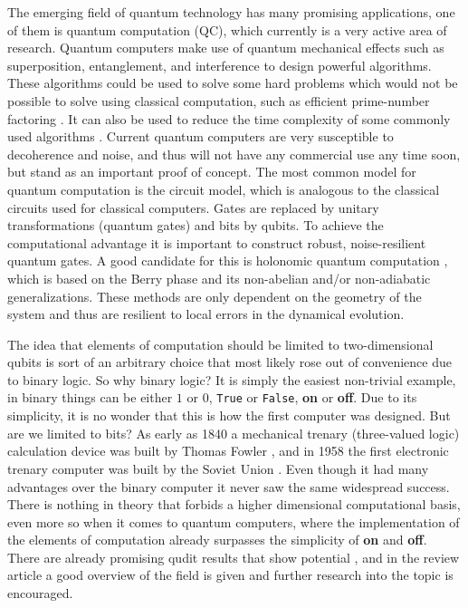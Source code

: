 The emerging field of quantum technology has many promising applications, one of them is quantum computation (QC), which currently is a very active area of research. Quantum computers make use of quantum mechanical effects such as superposition, entanglement, and interference to design powerful algorithms. These algorithms could be used to solve some hard problems which would not be  possible to solve using classical computation, such as efficient prime-number factoring \cite{shor}. It can also be used to reduce the time complexity of some commonly used algorithms \cite{Grover}. Current quantum computers are very susceptible to decoherence and noise, and thus will not have any commercial use any time soon, but stand as an important proof of concept. 
The most common model for quantum computation is the circuit model, which is analogous to the classical circuits used for classical computers. Gates are replaced by unitary transformations (quantum gates) and bits by qubits. To achieve the computational advantage it is important to construct robust, noise-resilient quantum gates. A good candidate for this is holonomic quantum computation \cite{HQC,NHQC}, which is based on the Berry phase \cite{berry} and its non-abelian and/or non-adiabatic generalizations\cite{anandan1,anandan2,zee}. These methods are only dependent on the geometry of the system and thus are resilient to local errors in the dynamical evolution.


The idea that elements of computation should be limited to two-dimensional qubits is sort of an arbitrary choice that most likely rose out of convenience due to binary logic. So why binary logic? It is simply the easiest non-trivial example, in binary things can be either $1$ or $0$, {\tt True} or {\tt False}, \textbf{on} or \textbf{off}. Due to its simplicity, it is no wonder that this is how the first computer was designed. But are we limited to bits? As early as 1840 a mechanical trenary (three-valued logic) calculation device was built by Thomas Fowler \cite{tricalc}, and in 1958 the first electronic trenary computer was built by the Soviet Union \cite{setun}. Even though it had many advantages over the binary computer it never saw the same widespread success. There is nothing in theory that forbids a higher dimensional computational basis, even more so when it comes to quantum computers, where the implementation of the elements of computation already surpasses the simplicity of \textbf{on} and \textbf{off}. There are already promising qudit results that show potential \cite{qutrit1,qudit2,qudit3}, and in the review article \cite{qudit} a good overview of the field is given and further research into the topic is encouraged.

